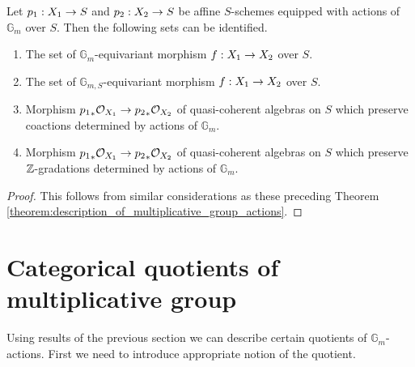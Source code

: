 \begin{theorem}\label{theorem:multiplicative_group_equivariant_morphisms}
Let $p_1:X_1\rightarrow S$ and $p_2:X_2\rightarrow S$ be affine $S$-schemes equipped with actions of $\mathbb{G}_m$ over $S$. Then the following sets can be identified.
\begin{enumerate}[label=\emph{\textbf{(\arabic*)}}, leftmargin=3.0em]
\item The set of $\mathbb{G}_m$-equivariant morphism $f:X_1\rightarrow X_2$ over $S$.
\item The set of $\mathbb{G}_{m,S}$-equivariant morphism $f:X_1\rightarrow X_2$ over $S$.
\item Morphism ${p_1}_*{\mathcal O}_{X_1}\rightarrow {p_2}_*{\mathcal O}_{X_2}$ of quasi-coherent algebras on $S$ which preserve coactions determined by actions of $\mathbb{G}_m$.
\item Morphism ${p_1}_*{\mathcal O}_{X_1}\rightarrow {p_2}_*{\mathcal O}_{X_2}$ of quasi-coherent algebras on $S$ which preserve ${\mathbb Z}$-gradations determined by actions of $\mathbb{G}_m$.
\end{enumerate}
\end{theorem}
\begin{proof}
This follows from similar considerations as these preceding Theorem \ref{theorem:description_of_multiplicative_group_actions}.
\end{proof}

\section{Categorical quotients of multiplicative group}
\noindent
Using results of the previous section we can describe certain quotients of $\mathbb{G}_m$-actions. First we need to introduce appropriate notion of the quotient.

